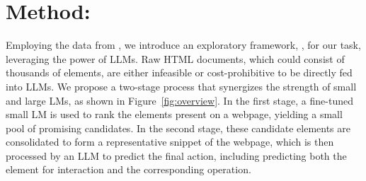 \section{Method: \model}
Employing the data from \mind, we introduce an exploratory framework, \model, for our task, leveraging the power of LLMs.
Raw HTML documents, which could consist of thousands of elements, are either infeasible or cost-prohibitive to be directly fed into LLMs.
We propose a two-stage process that synergizes the strength of small and large LMs, as shown in Figure~\ref{fig:overview}.
In the first stage, a fine-tuned small LM is used to rank the elements present on a webpage, yielding a small pool of promising candidates.
In the second stage, these candidate elements are consolidated to form a representative snippet of the webpage, which is then processed by an LLM to predict the final action, including predicting both the element for interaction and the corresponding operation.


